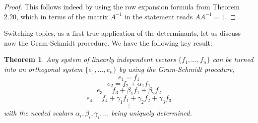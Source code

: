 \documentclass[12pt]{amsbook}
\newtheorem{theorem}{Theorem}[chapter]
\begin{document}
\begin{proof}
This follows indeed by using the row expansion formula from Theorem 2.20, which in terms of the matrix $A^{-1}$ in the statement reads $AA^{-1}=1$.
\end{proof}

Switching topics, as a first true application of the determinants, let us discuss now the Gram-Schmidt procedure. We have the following key result:

\begin{theorem}
Any system of linearly independent vectors $\{f_1,\ldots,f_n\}$ can be turned into an orthogonal system $\{e_1,\ldots,e_n\}$ by using the Gram-Schmidt procedure,
$$e_1=f_1$$
$$e_2=f_2+\alpha_1f_1$$
$$e_3=f_3+\beta_1f_1+\beta_2f_2$$
$$e_4=f_4+\gamma_1f_1+\gamma_2f_2+\gamma_3f_3$$
$$\vdots$$
with the needed scalars $\alpha_i,\beta_i,\gamma_i,\ldots$ being uniquely determined.
\end{theorem}
\end{document}

